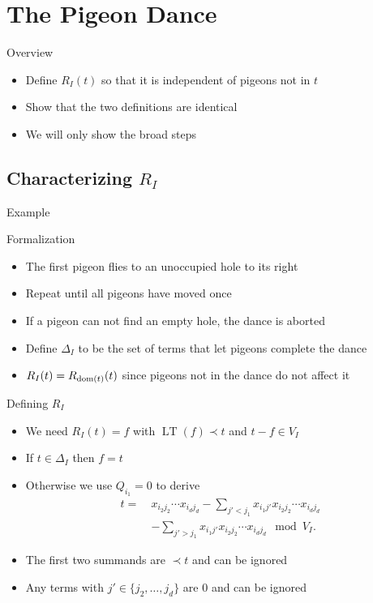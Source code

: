 \documentclass[xcolor={dvipsnames}]{beamer}
\newcommand{\LT}{\operatorname{LT}}
\begin{document}
\section{The Pigeon Dance}
\begin{frame}{Overview}
    \begin{itemize}[<+->]
        \item Define $R_I(t)$ so that it is independent of pigeons not in $t$
        \item Show that the two definitions are identical
        \item We will only show the broad steps
    \end{itemize}
\end{frame}

\subsection{Characterizing \texorpdfstring{$R_I$}{RI}}
\begin{frame}{Example}
    
\end{frame}

\begin{frame}{Formalization}
    \begin{itemize}[<+->]
        \item The first pigeon flies to an unoccupied hole to its right
        \item Repeat until all pigeons have moved once
        \item If a pigeon can not find an empty hole, the dance is aborted
        \item Define $\Delta_I$ to be the set of terms that let pigeons complete the dance
        \item $R_I(t) = R_{\operatorname{dom}(t)}(t)$ since pigeons not in the dance do not affect it
    \end{itemize}
\end{frame}

\begin{frame}{Defining $R_I$}
    \begin{itemize}[<+->]
        \item We need $R_I(t) = f$ with $\LT(f) \prec t$ and $t - f \in V_I$
        \item If $t \in \Delta_I$ then $f = t$
        \item Otherwise we use $Q_{i_1} = 0$ to derive
            \begin{align*}
                t = \ &x_{i_2 j_2} \cdots x_{i_d j_d} - \sum_{j' < j_1} x_{i_1 j'} x_{i_2 j_2} \cdots x_{i_d j_d}\\
                &- \sum_{j' > j_1} x_{i_1 j'} x_{i_2 j_2} \cdots x_{i_d j_d} \mod V_I.
            \end{align*}
        \item The first two summands are $\prec t$ and can be ignored
        \item Any terms with $j' \in \{j_2, \ldots, j_d\}$ are $0$ and can be ignored
    \end{itemize}
\end{frame}
\end{document}
